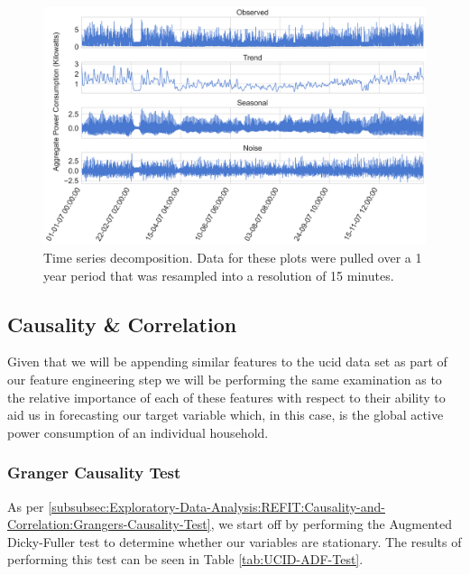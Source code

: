 \begin{figure}[H]
    \centering
    \includegraphics[width=\textwidth]{Images/Chapter 5/UCID/UCID-Time-Series-Decomposition.png}
    \caption{Time series decomposition. Data for these plots were pulled over a 1 year period that was resampled into a resolution of 15 minutes.}
    \label{fig:UCID-Time-Series-Decomposition}
\end{figure}

\subsection{Causality \& Correlation}
\label{subsec:Exploratory-Data-Analysis:UCID:Causality-and-Correlation}
Given that we will be appending similar features to the \gls{ucid} data set as part of our feature engineering step we will be performing the same examination as to the relative importance of each of these features with respect to their ability to aid us in forecasting our target variable which, in this case, is the global active power consumption of an individual household.

\subsubsection{Granger Causality Test}
\label{subsubsec:Exploratory-Data-Analysis:UCID:Causality-and-Correlation:Grangers-Causality-Test}
As per \ref{subsubsec:Exploratory-Data-Analysis:REFIT:Causality-and-Correlation:Grangers-Causality-Test}, we start off by performing the Augmented Dicky-Fuller test to determine whether our variables are stationary. The results of performing this test can be seen in Table \ref{tab:UCID-ADF-Test}.

